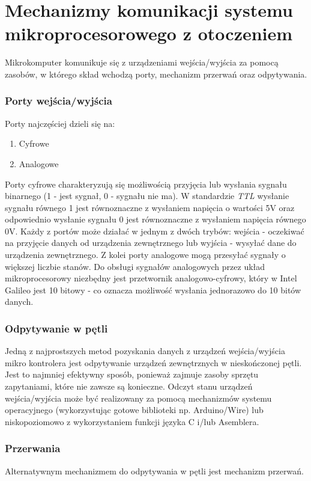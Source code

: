 \documentclass{xmgr}
\begin{document}
\chapter{Mechanizmy komunikacji systemu mikroprocesorowego z otoczeniem}
Mikrokomputer komunikuje się z urządzeniami wejścia/wyjścia za pomocą zasobów, w którego skład wchodzą porty, mechanizm przerwań oraz odpytywania.
\subsection{Porty wejścia/wyjścia}
Porty najczęściej dzieli się na:
\begin{enumerate}
	\item Cyfrowe
	\item Analogowe
\end{enumerate}

Porty cyfrowe charakteryzują się możliwością przyjęcia lub wysłania sygnału binarnego (1 - jest sygnał, 0 - sygnału nie ma). W standardzie \emph{TTL} wysłanie sygnału równego 1 jest równoznaczne z wysłaniem napięcia o wartości 5V oraz odpowiednio wysłanie sygnału 0 jest równoznaczne z wysłaniem napięcia równego 0V. Każdy z portów może działać w jednym  z dwóch trybów: wejścia - oczekiwać na przyjęcie danych od urządzenia zewnętrznego lub wyjścia - wysyłać dane do urządzenia zewnętrznego. Z kolei porty analogowe mogą przesyłać sygnały o większej liczbie stanów. Do obsługi sygnałów analogowych przez układ mikroprocesorowy niezbędny jest przetwornik analogowo-cyfrowy, który w Intel Galileo jest 10 bitowy - co oznacza możliwość wysłania jednorazowo do 10 bitów danych.

\subsection{Odpytywanie w pętli}
Jedną z najprostszych metod pozyskania danych z urządzeń wejścia/wyjścia mikro kontrolera jest odpytywanie urządzeń zewnętrznych w nieskończonej pętli. Jest to najmniej efektywny sposób, ponieważ zajmuje zasoby sprzętu zapytaniami, które nie zawsze są konieczne. Odczyt stanu urządzeń wejścia/wyjścia może być realizowany za pomocą mechanizmów systemu operacyjnego (wykorzystując gotowe biblioteki np. Arduino/Wire) lub niskopoziomowo z wykorzystaniem funkcji języka C i/lub Asemblera.

\subsection{Przerwania}
Alternatywnym mechanizmem do odpytywania w pętli jest mechanizm przerwań. 
\end{document}
